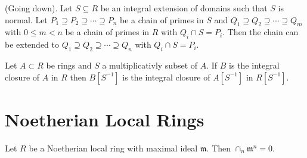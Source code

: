 \documentclass{memoir}
\begin{document}
\begin{thm}
    \label{thm:going_down}
    (Going down).
    Let $S\subseteq R$ be an integral extension of domains such that $S$ is normal.
    Let $P_1\supseteq P_2\supseteq \cdots \supseteq P_n$ be a chain of primes in $S$ and $Q_1\supseteq Q_2\supseteq \cdots \supseteq Q_m$ with $0\le m < n$ be a chain of primes in $R$ with $Q_i\cap S = P_i$.
    Then the chain can be extended to $Q_1\supseteq Q_2\supseteq \cdots \supseteq Q_n$ with $Q_i\cap S = P_i$.
\end{thm}
\begin{proposition}
    Let $A\subset R$ be rings and $S$ a multiplicativly subset of $A$.
    If $B$ is the integral closure of $A$ in $R$ then $B[S^{-1}]$ is the integral closure of $A[S^{-1}]$ in $R[S^{-1}]$.
\end{proposition}
\section{Noetherian Local Rings}
\begin{thm}
    \label{thm:noeth_loc_ring}
    Let $R$ be a Noetherian local ring with maximal ideal $\mathfrak m$.
    Then $\cap_n\mathfrak m^n = 0$.
\end{thm}
\end{document}
